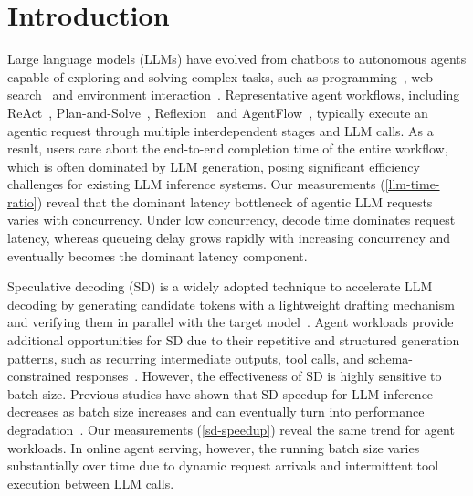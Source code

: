 \section{Introduction}


Large language models (LLMs) have evolved from chatbots to autonomous agents capable of exploring and solving complex tasks, such as programming~\citep{MBPP}, web search~\citep{WebGPT} and environment interaction~\citep{InterCode}.
Representative agent workflows, including ReAct~\citep{ReAct}, Plan-and-Solve~\citep{Plan-and-Solve}, Reflexion~\citep{Reflexion} and AgentFlow~\citep{AgentFlow}, typically execute an agentic request through multiple interdependent stages and LLM calls. 
As a result, users care about the end-to-end completion time of the entire workflow, which is often dominated by LLM generation, posing significant efficiency challenges for existing LLM inference systems.
Our measurements (\autoref{llm-time-ratio}) reveal that the dominant latency bottleneck of agentic LLM requests varies with concurrency. Under low concurrency, decode time dominates request latency, whereas queueing delay grows rapidly with increasing concurrency and eventually becomes the dominant latency component. 


Speculative decoding (SD) is a widely adopted technique to accelerate LLM decoding by generating candidate tokens with a lightweight drafting mechanism and verifying them in parallel with the target model~\citep{SD1,SD2,Eagle}. 
Agent workloads provide additional opportunities for SD due to their repetitive and structured generation patterns, such as recurring intermediate outputs, tool calls, and schema-constrained responses~\citep{SuffixDecoding,ToolSpec,AgentSpec}.
However, the effectiveness of SD is highly sensitive to batch size. Previous studies have shown that SD speedup for LLM inference decreases as batch size increases and can eventually turn into performance degradation~\citep{SD-Speedup,SSSD,TurboSpec}. 
Our measurements (\autoref{sd-speedup}) reveal the same trend for agent workloads. In online agent serving, however, the running batch size varies substantially over time due to dynamic request arrivals and intermittent tool execution between LLM calls.

